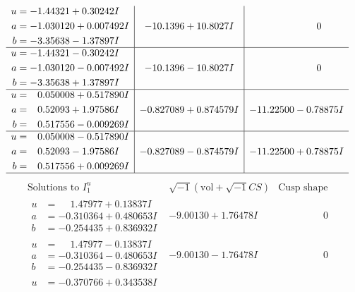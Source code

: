 \documentclass[1p]{elsarticle_modified}
\theoremstyle{definition}
\newcommand{\I}{\sqrt{-1}}
\begin{document}
$$\begin{array}{c|c|c}
\begin{aligned}
u &= -1.44321 + 0.30242 I \\
a &= -1.030120 + 0.007492 I \\
b &= -3.35638 - 1.37897 I\end{aligned}
 & -10.1396 + 10.8027 I & \phantom{-0.000000 } 0 \\ \hline\begin{aligned}
u &= -1.44321 - 0.30242 I \\
a &= -1.030120 - 0.007492 I \\
b &= -3.35638 + 1.37897 I\end{aligned}
 & -10.1396 - 10.8027 I & \phantom{-0.000000 } 0 \\ \hline\begin{aligned}
u &= \phantom{-}0.050008 + 0.517890 I \\
a &= \phantom{-}0.52093 + 1.97586 I \\
b &= \phantom{-}0.517556 - 0.009269 I\end{aligned}
 & -0.827089 + 0.874579 I & -11.22500 - 0.78875 I \\ \hline\begin{aligned}
u &= \phantom{-}0.050008 - 0.517890 I \\
a &= \phantom{-}0.52093 - 1.97586 I \\
b &= \phantom{-}0.517556 + 0.009269 I\end{aligned}
 & -0.827089 - 0.874579 I & -11.22500 + 0.78875 I\\
 \hline 
 \end{array}$$\newpage$$\begin{array}{c|c|c}  
\text{Solutions to }I^u_{1}& \I (\text{vol} + \sqrt{-1}CS) & \text{Cusp shape}\\
 \hline 
\begin{aligned}
u &= \phantom{-}1.47977 + 0.13837 I \\
a &= -0.310364 + 0.480653 I \\
b &= -0.254435 + 0.836932 I\end{aligned}
 & -9.00130 + 1.76478 I & \phantom{-0.000000 } 0 \\ \hline\begin{aligned}
u &= \phantom{-}1.47977 - 0.13837 I \\
a &= -0.310364 - 0.480653 I \\
b &= -0.254435 - 0.836932 I\end{aligned}
 & -9.00130 - 1.76478 I & \phantom{-0.000000 } 0 \\ \hline\begin{aligned}
u &= -0.370766 + 0.343538 I \\

\end{aligned}
\end{array}$$
\end{document}
